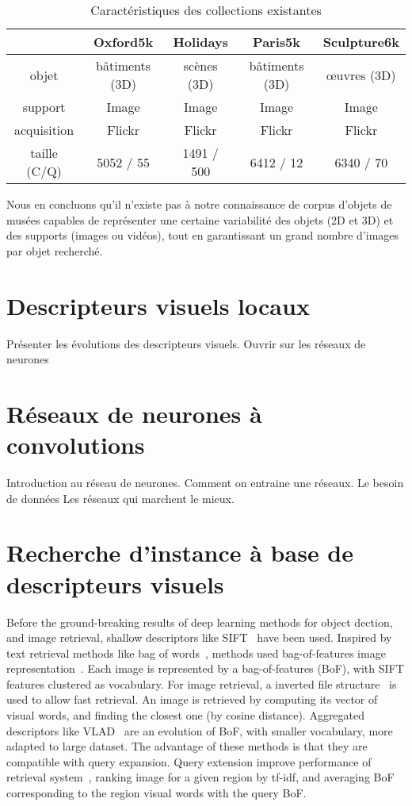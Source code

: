 \begin{table}[htb]
    \centering
    \begin{tabular}{| c || c | c | c | c |}
    \hline 
    & Oxford5k & Holidays & Paris5k & Sculpture6k \\
    \hline \hline
    objet & bâtiments (3D) & scènes (3D) & bâtiments (3D) & œuvres (3D) \\
    \hline 
    support & Image & Image & Image & Image \\
    \hline
    acquisition & Flickr &  Flickr & Flickr & Flickr \\
    \hline
    taille (C/Q) &  5052 / 55 & 1491 / 500 & 6412 / 12& 6340 / 70\\
    \hline
    \end{tabular}
    \caption{Caractéristiques des collections existantes}
    \label{tab:exist_corpus}
\end{table}

Nous en concluons qu'il n'existe pas à notre connaissance de corpus d'objets de musées capables de représenter une certaine variabilité des objets (2D et 3D) et des supports (images ou vidéos), tout en garantissant un grand nombre d'images par objet recherché.


\section{Descripteurs visuels locaux}

Présenter les évolutions des descripteurs visuels.
Ouvrir sur les réseaux de neurones


\section{Réseaux de neurones à convolutions}

Introduction au réseau de neurones.
Comment on entraine une réseaux.
Le besoin de données
Les réseaux qui marchent le mieux.


\section{Recherche d'instance à base de descripteurs visuels}
Before the ground-breaking results of deep learning methods for object dection, and image retrieval, shallow descriptors like SIFT~\cite{lowe2004distinctive} have been used. Inspired by text retrieval methods like bag of words~\cite{barroso2003web}, methods used bag-of-features image representation~\cite{sivic2003video}. Each image is represented by a bag-of-features (BoF), with SIFT features clustered as vocabulary. For image retrieval, a inverted file structure~\cite{witten1999managing} is used to allow fast retrieval. An image is retrieved by computing its vector of visual words, and finding the closest one (by cosine distance).
Aggregated descriptors like VLAD~\cite{jegou2010aggregating} are an evolution of BoF, with smaller vocabulary, more adapted to large dataset.
The advantage of these methods is that they are compatible with query expansion. Query extension improve performance of retrieval system~\cite{arandjelovic2012three}, ranking image for a given region by tf-idf, and averaging BoF corresponding to the region visual words with the query BoF.

